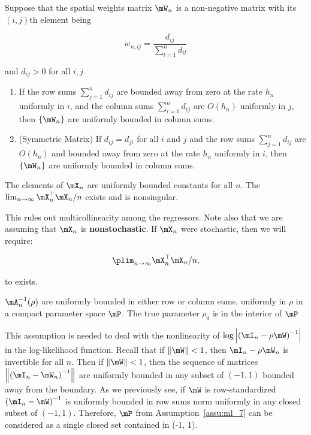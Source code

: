 \documentclass[english,12pt]{book}\usepackage[]{graphicx}\usepackage[]{xcolor}
\begin{document}
\begin{lemma}
  Suppose that the spatial weights matrix $\mW_n$ is a non-negative matrix with its $(i,j)$th element being 
  
  \begin{equation*}
    w_{n,ij} = \frac{d_{ij}}{\sum_{l = 1}^nd_{il}}
  \end{equation*}
  
  and $d_{ij}>0$ for all $i,j$.
  
  \begin{enumerate}
    \item If the row sums $\sum_{j = 1}^nd_{ij}$ are bounded away from zero at the rate $h_n$ uniformly in $i$, and the column sums $\sum_{i = 1}^nd_{ij}$ are $O(h_n)$ uniformly in $j$, then $\left\lbrace \mW_n \right\rbrace$  are uniformly bounded in column sums.
    \item (Symmetric Matrix) If $d_{ij} = d_{ji}$ for all $i$ and $j$ and the row sums $\sum_{j = 1}^nd_{ij}$ are $O(h_n)$ and bounded away from zero at the rate $h_n$ uniformly in $i$, then $\left\lbrace \mW_n \right\rbrace$  are uniformly bounded in column sums.
  \end{enumerate}
\end{lemma}

\begin{assumption}\label{assu:ml_6}
	The elements of $\mX_n$ are uniformly bounded constants for all $n$. The $\lim_{n\to \infty}\mX_n^\top\mX_n/n$ exists and is nonsingular. 
\end{assumption}

This rules out multicollinearity among the regressors. Note also that we are assuming that $\mX_n$ is \textbf{nonstochastic}. If $\mX_n$ were stochastic, then we will require:

\begin{equation*}
  \plim_{n\to \infty}\mX_n^\top\mX_n/ n,
\end{equation*}

to exists.

\begin{assumption}\label{assu:ml_7}
	${\mA_n^{-1}(\rho)}$ are uniformly bounded in either row or column sums, uniformly in $\rho$ in a compact parameter space $\mP$. The true parameter $\rho_0$ is in the interior of $\mP$
\end{assumption}

This assumption is needed to deal with the nonlinearity of $\log \left|\left(\mI_n - \rho \mW\right)^{-1}\right|$ in the log-likelihood function. Recall that if $\left\| \mW\right\| < 1$, then $\mI_n - \rho\mW_n$ is invertible for all $n$. Then if $\left\| \mW\right\| < 1$, then the sequence of matrices $\left\|\left(\mI_n- \mW_n\right)^{-1}\right\|$ are uniformly bounded in any subset of $(-1, 1)$ bounded away from the boundary. As we previously see, if $\mW$ is row-standardized $\left(\mI_n- \mW\right)^{-1}$ is uniformly bounded in row sums norm uniformly in any closed subset of $(-1, 1)$. Therefore, $\mP$ from Assumption~\ref{assu:ml_7} can be considered as a single closed set contained in (-1, 1).
\end{document}
